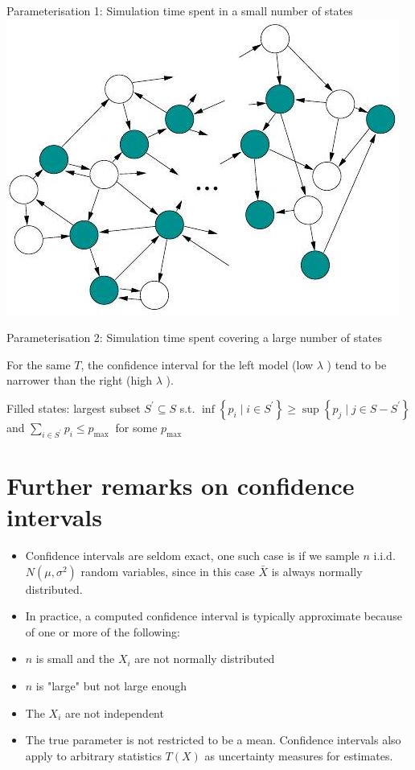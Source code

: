 \documentclass[10pt]{article}
\begin{document}
Parameterisation 1: Simulation time spent in a small number of states\\
\includegraphics[max width=\textwidth, center]{2025_05_12_520db7cd238ba7b44f0fg-31}

Parameterisation 2: Simulation time spent covering a large number of states

For the same $T$, the confidence interval for the left model (low $\lambda$ ) tend to be narrower than the right (high $\lambda$ ).

Filled states: largest subset $S^{\prime} \subseteq S$ s.t. $\inf \left\{p_{i} \mid i \in S^{\prime}\right\} \geq \sup \left\{p_{j} \mid j \in S-S^{\prime}\right\}$ and $\sum_{i \in S^{\prime}} p_{i} \leq p_{\text {max }}$ for some $p_{\text {max }}$

\section*{Further remarks on confidence intervals}
\begin{itemize}
  \item Confidence intervals are seldom exact, one such case is if we sample $n$ i.i.d. $N\left(\mu, \sigma^{2}\right)$ random variables, since in this case $\bar{X}$ is always normally distributed.
  \item In practice, a computed confidence interval is typically approximate because of one or more of the following:
  \item $n$ is small and the $X_{i}$ are not normally distributed
  \item $n$ is "large" but not large enough
  \item The $X_{i}$ are not independent
  \item The true parameter is not restricted to be a mean. Confidence intervals also apply to arbitrary statistics $T(X)$ as uncertainty measures for estimates.
\end{itemize}
\end{document}
